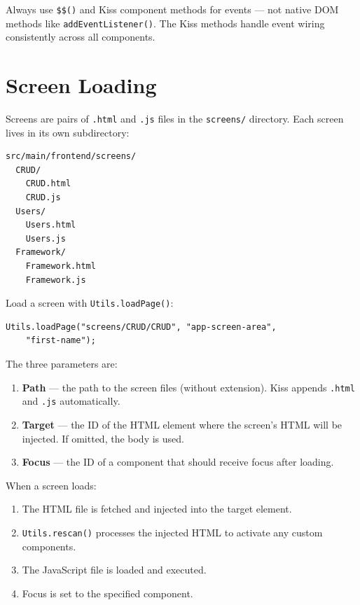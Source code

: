 \begin{warnbox}
Always use \texttt{\$\$()} and Kiss component methods for events --- not native DOM methods like \texttt{addEventListener()}.  The Kiss methods handle event wiring consistently across all components.
\end{warnbox}

\section{Screen Loading}
\label{sec:fe-screens}

Screens are pairs of \texttt{.html} and \texttt{.js} files in the \texttt{screens/} directory.  Each screen lives in its own subdirectory:

\begin{lstlisting}
src/main/frontend/screens/
  CRUD/
    CRUD.html
    CRUD.js
  Users/
    Users.html
    Users.js
  Framework/
    Framework.html
    Framework.js
\end{lstlisting}

\noindent
Load a screen with \texttt{Utils.loadPage()}:

\begin{lstlisting}[style=javascript]
Utils.loadPage("screens/CRUD/CRUD", "app-screen-area",
    "first-name");
\end{lstlisting}

\noindent
The three parameters are:
\begin{enumerate}
  \item \textbf{Path} --- the path to the screen files (without extension).  Kiss appends \texttt{.html} and \texttt{.js} automatically.
  \item \textbf{Target} --- the ID of the HTML element where the screen's HTML will be injected.  If omitted, the body is used.
  \item \textbf{Focus} --- the ID of a component that should receive focus after loading.
\end{enumerate}

\noindent
When a screen loads:
\begin{enumerate}
  \item The HTML file is fetched and injected into the target element.
  \item \texttt{Utils.rescan()} processes the injected HTML to activate any custom components.
  \item The JavaScript file is loaded and executed.
  \item Focus is set to the specified component.
\end{enumerate}


